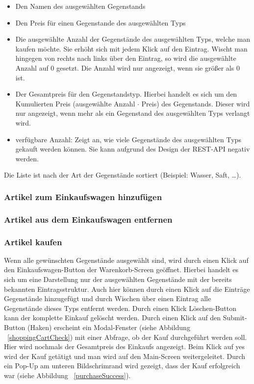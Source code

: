 \begin{itemize}
	\item Den Namen des ausgewählten Gegenstands

	\item Den Preis für einen Gegenstande des ausgewählten Typs

	\item Die ausgewählte Anzahl der Gegenstände des ausgewählten Typs, welche man kaufen möchte.
	Sie erhöht sich mit jedem Klick auf den Eintrag.
	Wischt man hingegen von rechts nach links über den Eintrag, so wird die ausgewählte Anzahl auf 0 gesetzt.
	Die Anzahl wird nur angezeigt, wenn sie größer als 0 ist.

	\item Der Gesamtpreis für den Gegenstandstyp.
	Hierbei handelt es sich um den Kumulierten Preis (ausgewählte Anzahl $\cdot$ Preis) des Gegenstands.
	Dieser wird nur angezeigt, wenn mehr als ein Gegenstand des ausgewählten Typs verlangt wird.

	\item verfügbare Anzahl: Zeigt an, wie viele Gegenstände des ausgewählten Typs gekauft werden können.
	Sie kann aufgrund des Design der REST-API negativ werden.
\end{itemize}

Die Liste ist nach der Art der Gegenstände sortiert (Beispiel: Wasser, Saft, \ldots).

\subsubsection{Artikel zum Einkaufswagen hinzufügen} \label{subsubsec:shoppingcart-add-item}

\subsubsection{Artikel aus dem Einkaufswagen entfernen} \label{subsubsec:shoppingcart-del-item}

\subsubsection{Artikel kaufen} \label{subsubsec:shop-buy}

Wenn alle gewünschten Gegenstände ausgewählt sind, wird durch einen Klick auf den Einkaufswagen-Button der Warenkorb-Screen geöffnet.
Hierbei handelt es sich um eine Darstellung nur der ausgewählten Gegenstände mit der bereits bekannten Eintragsstruktur.
Auch hier können durch einen Klick auf die Einträge Gegenstände hinzugefügt und durch Wischen über einen Eintrag alle Gegenstände dieses Typs entfernt werden.
Durch einen Klick Löschen-Button kann der komplette Einkauf gelöscht werden.
Durch einen Klick auf den Submit-Button (Haken) erscheint ein Modal-Fenster (siehe Abbildung ~\ref{shoppingCartCheck}) mit einer Abfrage, ob der Kauf durchgeführt werden soll.
Hier wird nochmals der Gesamtpreis des Einkaufs angezeigt.
Beim Klick auf \glqq yes\grqq{} wird der Kauf getätigt und man wird auf den Main-Screen weitergeleitet.
Durch ein Pop-Up am unteren Bildschrimrand wird gezeigt, dass der Kauf erfolgreich war (siehe Abbildung ~\ref{purchaseSuccess}).

